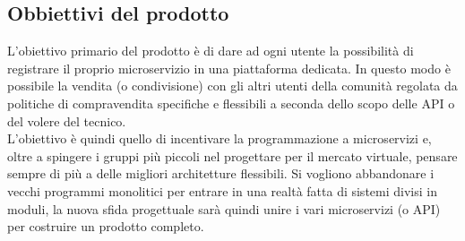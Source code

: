 \documentclass[12pt,a4paper,titlepage]{article}
\begin{document}
	\subsection{Obbiettivi del prodotto}
	L'obiettivo primario del prodotto è di dare ad ogni utente la possibilità di registrare il proprio microservizio in una piattaforma dedicata. In questo modo è possibile la vendita (o condivisione) con gli altri utenti della comunità regolata da politiche di compravendita specifiche e flessibili a seconda dello scopo delle API o del volere del tecnico.\\
	L'obiettivo è quindi quello di incentivare la programmazione a microservizi e, oltre a spingere i gruppi più piccoli nel progettare per il mercato virtuale, pensare sempre di più a delle migliori architetture flessibili. Si vogliono abbandonare i vecchi programmi monolitici per entrare in una realtà fatta di sistemi divisi in moduli, la nuova sfida progettuale sarà quindi unire i vari microservizi (o API) per costruire un prodotto completo.
	
\end{document}
